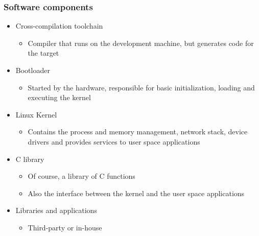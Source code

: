 \begin{frame}
  \frametitle{Software components}
  \begin{itemize}
  \item Cross-compilation toolchain
    \begin{itemize}
    \item Compiler that runs on the development machine, but generates
      code for the target
    \end{itemize}
  \item Bootloader
    \begin{itemize}
    \item Started by the hardware, responsible for basic
      initialization, loading and executing the kernel
    \end{itemize}
  \item Linux Kernel
    \begin{itemize}
    \item Contains the process and memory management, network stack,
      device drivers and provides services to user space applications
    \end{itemize}
  \item C library
    \begin{itemize}
    \item Of course, a library of C functions
    \item Also the interface between the kernel and the user space
      applications
    \end{itemize}
  \item Libraries and applications
    \begin{itemize}
    \item Third-party or in-house
    \end{itemize}
  \end{itemize}
\end{frame}

